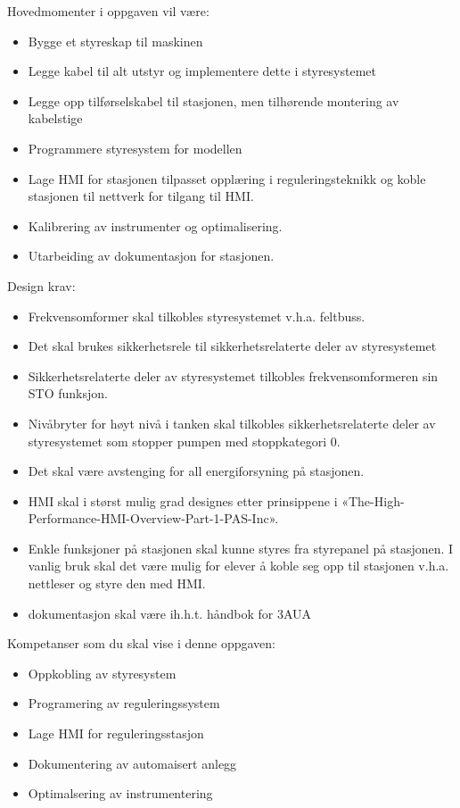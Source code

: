 \vskip 5pt 
 Hovedmomenter i oppgaven vil være: 
\begin{itemize}[noitemsep]
	\item Bygge et styreskap til maskinen
	\item Legge kabel til alt utstyr og implementere dette i styresystemet
	\item Legge opp tilførselskabel til stasjonen, men tilhørende montering av kabelstige 
	\item Programmere styresystem for modellen 
	\item Lage HMI for stasjonen tilpasset opplæring i reguleringsteknikk og koble stasjonen til  nettverk for tilgang til HMI.  
	\item Kalibrering av instrumenter og optimalisering. 
	\item Utarbeiding av dokumentasjon for stasjonen. 
\end{itemize}



 

Design krav:  
\begin{itemize}[noitemsep]
	\item Frekvensomformer skal tilkobles styresystemet v.h.a. feltbuss.
	\item Det skal brukes sikkerhetsrele til sikkerhetsrelaterte deler av styresystemet
	\item Sikkerhetsrelaterte deler av styresystemet tilkobles frekvensomformeren sin STO funksjon.  
	\item Nivåbryter for høyt nivå i tanken skal tilkobles sikkerhetsrelaterte deler av styresystemet som stopper pumpen med stoppkategori 0.
	\item Det skal være avstenging for all energiforsyning på stasjonen.  
	\item HMI skal i størst mulig grad designes etter prinsippene i «The-High-Performance-HMI-Overview-Part-1-PAS-Inc».  
	\item Enkle funksjoner på stasjonen skal kunne styres fra styrepanel på stasjonen. I vanlig bruk skal det være mulig for elever å koble seg opp til stasjonen v.h.a. nettleser og styre den med HMI.  
	\item dokumentasjon skal være ih.h.t. håndbok for 3AUA
\end{itemize}

\vskip 5pt 
Kompetanser som du skal vise i denne oppgaven:
\begin{itemize}[noitemsep]
	\item Oppkobling av styresystem
	\item Programering av reguleringssystem
	\item Lage HMI for reguleringsstasjon
	\item Dokumentering av automaisert anlegg
	\item Optimalsering av instrumentering
\end{itemize}



